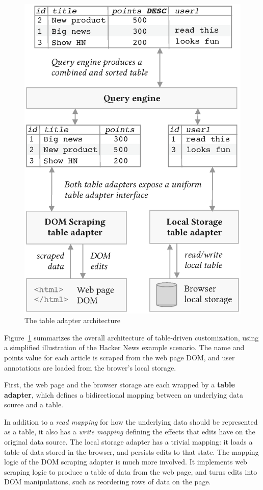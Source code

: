 \documentclass[sigplan,screen,10pt,anonymous,review]{acmart}
\begin{document}
\begin{figure}
\hypertarget{fig:table-adapter}{%
\centering
\includegraphics[width=\columnwidth]{media/table-adapter.eps}
\caption{The table adapter architecture}\label{fig:table-adapter}
}
\end{figure}

Figure~\ref{fig:table-adapter} summarizes the overall architecture of
table-driven customization, using a simplified illustration of the
Hacker News example scenario. The name and points value for each article
is scraped from the web page DOM, and user annotations are loaded from
the brower's local storage.

First, the web page and the browser storage are each wrapped by a
\textbf{table adapter}, which defines a bidirectional mapping between an
underlying data source and a table.

In addition to a \emph{read mapping} for how the underlying data should
be represented as a table, it also has a \emph{write mapping} defining
the effects that edits have on the original data source. The local
storage adapter has a trivial mapping: it loads a table of data stored
in the browser, and persists edits to that state. The mapping logic of
the DOM scraping adapter is much more involved. It implements web
scraping logic to produce a table of data from the web page, and turns
edits into DOM manipulations, such as reordering rows of data on the
page.
\end{document}
